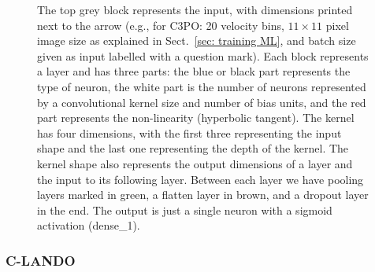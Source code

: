 \documentclass{aa}
\begin{document}
\begin{figure}[!t]
{    The top grey block represents the input, with dimensions printed next to the arrow (e.g., for C3PO: 20 velocity bins, $11\times11$ pixel image size as explained in Sect.~\ref{sec: training ML}, and batch size given as input labelled with a question mark).
    Each block represents a layer and has three parts: the blue or black part represents the type of neuron, the white part is the number of neurons represented by a convolutional kernel size and number of bias units, and the red part represents the non-linearity (hyperbolic tangent).
    The kernel has four dimensions, with the first three representing the input shape and the last one representing the depth of the kernel.
    The kernel shape also represents the output dimensions of a layer and the input to its following layer. %
    Between each layer we have pooling layers marked in green, a flatten layer in brown, and a dropout layer in the end. 
    The output is just a single neuron with a sigmoid activation (dense\_1).}
    \label{fig:c3po schematic}
\end{figure}

\subsubsection{C-LANDO}
\end{document}
